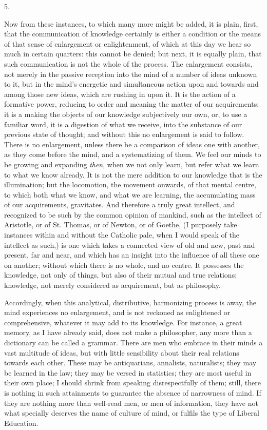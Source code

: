 5.

Now from these instances, to which many more might be added, it is
plain, first, that the communication of knowledge certainly is either
a condition or the means of that sense of enlargement or
enlightenment, of which at this day we hear so much in certain
quarters: this cannot be denied; but next, it is equally plain,
that such communication is not the whole of the process. The
enlargement consists, not merely in the passive reception into the
mind of a number of ideas unknown to it, but in the mind's energetic
and simultaneous action upon and towards and among those new ideas,
which are rushing in upon it. It is the action of a formative power,
reducing to order and meaning the matter of our acquirements; it is a
making the objects of our knowledge subjectively our own, or, to use a
familiar word, it is a digestion of what we receive, into the
substance of our previous state of thought; and without this no
enlargement is said to follow. There is no enlargement, unless there
be a comparison of ideas one with another, as they come before the
mind, and a systematizing of them. We feel our minds to be growing and
expanding \emph{then}, when we not only learn, but refer what we learn
to what we know already. It is not the mere addition to our knowledge
that is the illumination; but the locomotion, the movement onwards, of
that mental centre, to which both what we know, and what we are
learning, the accumulating mass of our acquirements, gravitates. And
therefore a truly great intellect, and recognized to be such by the
common opinion of mankind, such as the intellect of Aristotle, or of
St. Thomas, or of Newton, or of Goethe, (I purposely take instances
within and without the Catholic pale, when I would speak of the
intellect as such,) is one which takes a connected view of old and
new, past and present, far and near, and which has an insight into the
influence of all these one on another; without which there is no
whole, and no centre. It possesses the knowledge, not only of things,
but also of their mutual and true relations; knowledge, not merely
considered as acquirement, but as philosophy.

Accordingly, when this analytical, distributive, harmonizing
process is away, the mind experiences no enlargement, and is not
reckoned as enlightened or comprehensive, whatever it may add to its
knowledge. For instance, a great memory, as I have already said, does
not make a philosopher, any more than a dictionary can be called a
grammar. There are men who embrace in their minds a vast multitude of
ideas, but with little sensibility about their real relations towards
each other. These may be antiquarians, annalists, naturalists; they
may be learned in the law; they may be versed in statistics; they are
most useful in their own place; I should shrink from speaking
disrespectfully of them; still, there is nothing in such attainments
to guarantee the absence of narrowness of mind. If they are nothing
more than well-read men, or men of information, they have not what
specially deserves the name of culture of mind, or fulfils the type of
Liberal Education.

